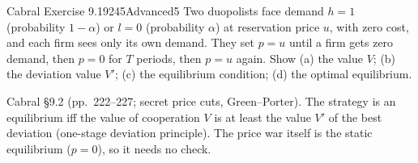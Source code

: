 \begin{exsol}{Cabral Exercise 9.19}{245}{Advanced}{5}
\asked Two duopolists face demand $h = 1$ (probability $1-\alpha$) or $l = 0$ (probability $\alpha$) at reservation
price $u$, with zero cost, and each firm sees only its own demand. They set $p = u$ until a firm gets zero demand,
then $p = 0$ for $T$ periods, then $p = u$ again. Show (a) the value $V$; (b) the deviation value $V'$; (c) the
equilibrium condition; (d) the optimal equilibrium.

\method Cabral \S9.2 (pp.~222--227; secret price cuts, Green--Porter). The strategy is an equilibrium iff the value of
cooperation $V$ is at least the value $V'$ of the best deviation (one-stage deviation principle). The price war
itself is the static equilibrium ($p = 0$), so it needs no check.


\end{exsol}
